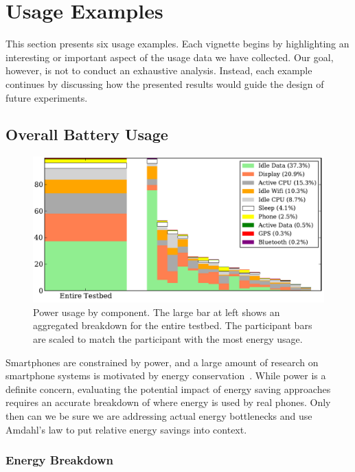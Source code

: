 \section{Usage Examples}
\label{sec-usage}

This section presents six \PhoneLab{} usage examples. Each vignette begins by
highlighting an interesting or important aspect of the usage data we have
collected. Our goal, however, is not to conduct an exhaustive analysis.
Instead, each example continues by discussing how the presented results would
guide the design of future \PhoneLab{} experiments.

\subsection{Overall Battery Usage}
\label{subsec-batteryoverview}

\begin{figure}[t]
\includegraphics[width=\textwidth]{./figures/power/breakdown/graph.pdf}
\caption{Power usage by component. \textnormal{The large bar at left shows an
aggregated breakdown for the entire testbed. The participant bars are scaled
to match the participant with the most energy usage.}}
\end{figure}

Smartphones are constrained by power, and a large amount of research on
smartphone systems is motivated by energy
conservation~\cite{FIXME,FIXME,FIXME}. While power is a definite concern,
evaluating the potential impact of energy saving approaches requires an
accurate breakdown of where energy is used by real phones. Only then can we
be sure we are addressing actual energy bottlenecks and use Amdahl's law to
put relative energy savings into context.

\subsubsection{Energy Breakdown}

